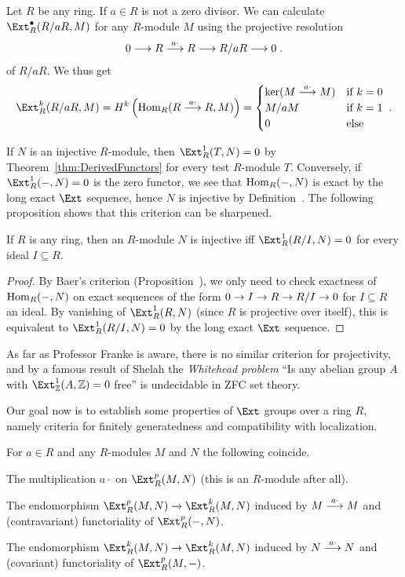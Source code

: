 \documentclass[a4paper,parskip=half,numbers=enddot, DIV=12]{scrreprt}
\begin{document}
\begin{example*}
	Let $R$ be any ring. If $a\in R$ is not a zero divisor. We can calculate $\Ext_R^\bullet(R/aR,M)$ for any $R$-module $M$ using the projective resolution
	\begin{align*}
		0\morphism R\morphism[ a\cdot]R\morphism R/aR\morphism 0\;.
	\end{align*}
	of $R/aR$. We thus get
	\begin{align*}
		\Ext_R^k(R/aR,M)=H^k\left(\Hom_R(R\morphism[ a\cdot]R,M)\right)=\begin{cases}
			\ker(M\morphism[ a\cdot]M) & \text{if }k=0\\
			M/aM & \text{if }k=1\\
			0 & \text{else}
		\end{cases}\;.
	\end{align*}
\end{example*}
If $N$ is an injective $R$-module, then $\Ext_R^1(T,N)=0$ by Theorem~\ref{thm:DerivedFunctors} for every test $R$-module $T$. Conversely, if $\Ext_R^1(-,N)=0$ is the zero functor, we see that $\operatorname{Hom}_R(-,N)$ is exact by the long exact $\Ext$ sequence, hence $N$ is injective by Definition~. The following proposition shows that this criterion can be sharpened.
\begin{prop}
	If $R$ is any ring, then an $R$-module $N$ is injective iff $\Ext_R^1(R/I,N)=0$ for every ideal $I\subseteq R$.
\end{prop}
\begin{proof}
	By Baer's criterion (Proposition~), we only need to check exactness of $\operatorname{Hom}_R(-,N)$ on exact sequences of the form $0\morphism I\morphism R\morphism R/I\morphism 0$ for $I\subseteq R$ an ideal. By vanishing of $\Ext_R^1(R,N)$ (since $R$ is projective over itself), this is equivalent to $\Ext_R^1(R/I,N)=0$ by the long exact $\Ext$ sequence.
\end{proof}
\begin{rem*}
	As far as Professor Franke is aware, there is no similar criterion for projectivity, and by a famous result of Shelah the \emph{Whitehead problem} ``Is any abelian group $A$ with $\Ext_\IZ^1(A,\IZ)=0$ free'' is undecidable in ZFC set theory.
\end{rem*}
Our goal now is to establish some properties of $\Ext$ groups over a ring $R$, namely criteria for finitely generatedness and compatibility with localization.
\begin{fact}
	For $a\in R$ and any $R$-modules $M$ and $N$ the following coincide.
	\begin{alphanumerate}
		\item The multiplication $a\cdot $ on $\Ext_R^p(M,N)$ (this is an $R$-module after all).
		\item The endomorphism $\Ext_R^p(M,N)\morphism\Ext_R^k(M,N)$ induced by $M\morphism[ a\cdot]M$ and (contravariant) functoriality of $\Ext_R^p(-,N)$.
		\item The endomorphism $\Ext_R^k(M,N)\morphism\Ext_R^k(M,N)$ induced by $N\morphism[ a\cdot]N$ and (covariant) functoriality of $\Ext_R^p(M,-)$.
	\end{alphanumerate}
\end{fact}
\end{document}
